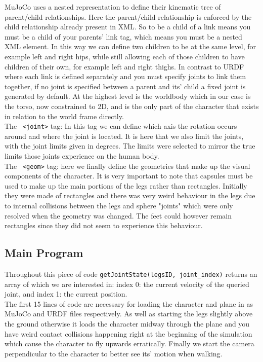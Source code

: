\documentclass[12pt, a4paper]{article}
\begin{document}
MuJoCo uses a nested representation to define their kinematic tree of parent/child relationships. Here the parent/child relationship is enforced by the child relationship already present in XML. So to be a child of a link means you must be a child of your parents' link tag, which means you must be a nested XML element. In this way we can define two children to be at the same level, for example left and right hips, while still allowing each of those children to have children of their own, for example left and right thighs. In contrast to URDF where each link is defined separately and you must specify joints to link them together, if no joint is specified between a parent and its' child a fixed joint is generated by default.  At the highest level is the worldbody which in our case is the torso, now constrained to 2D, and is the only part of the character that exists in relation to the world frame directly.\\

The \verb; <joint>; tag: In this tag we can define which axis the rotation occurs around and where the joint is located. It is here that we also limit the joints, with the joint limits given in degrees. The limits were selected to mirror the true limits those joints experience on the human body. \\

The \verb; <geom>; tag: here we finally define the geometries that make up the visual components of the character. It is very important to note that capsules must be used to make up the main portions of the legs rather than rectangles. Initially they were made of rectangles and there was very weird behaviour in the legs due to internal collisions between the legs and sphere "joints" which were only resolved when the geometry was changed. The feet could however remain rectangles since they did not seem to experience this behaviour.\\ 

\subsection{Main Program}

Throughout this piece of code \verb;getJointState(legsID, joint_index); returns an array of which we are interested in: index 0: the current velocity of the queried joint, and index 1: the current position.\\

The first 15 lines of code are necessary for loading the character and plane in as MuJoCo and URDF files respectively. As well as starting the legs slightly above the ground otherwise it loads the character midway through the plane and you have weird contact collisions happening right at the beginning of the simulation which cause the character to fly upwards erratically. Finally we start the camera perpendicular to the character to better see its' motion when walking.\\
\end{document}

